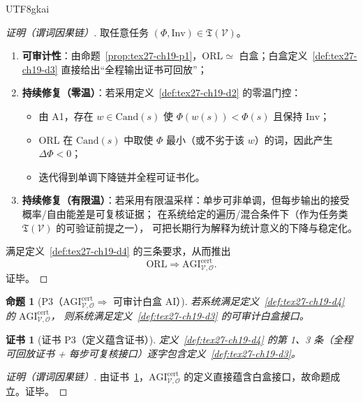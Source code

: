 \documentclass[12pt]{article}
\newtheorem{proposition}{命题}[section]
\newtheorem{Certificate}{证书}[section]
\begin{document}
\begin{CJK*}{UTF8}{gkai}
\begin{proof}[证明（谓词因果链）]
取任意任务 $(\Phi,\mathrm{Inv})\in\mathfrak{T}(\mathcal{V})$。
\begin{enumerate}
  \item \textbf{可审计性}：由命题~\ref{prop:tex27-ch19-p1}，$\mathrm{ORL}\simeq$ 白盒；白盒定义~\ref{def:tex27-ch19-d3} 直接给出“全程输出证书可回放”；
  \item \textbf{持续修复（零温）}：若采用定义~\ref{def:tex27-ch19-d2} 的零温门控：
  \begin{itemize}
    \item 由 A1，存在 $w\in\mathrm{Cand}(s)$ 使 $\Phi(w(s))<\Phi(s)$ 且保持 $\mathrm{Inv}$；
    \item ORL 在 $\mathrm{Cand}(s)$ 中取使 $\Phi$ 最小（或不劣于该 $w$）的词，因此产生 $\Delta\Phi<0$；
    \item 迭代得到单调下降链并全程可证书化。
  \end{itemize}
  \item \textbf{持续修复（有限温）}：若采用有限温采样：单步可非单调，但每步输出的接受概率/自由能差是可复核证据；
  在系统给定的遍历/混合条件下（作为任务类 $\mathfrak{T}(\mathcal{V})$ 的可验证前提之一），
  可把长期行为解释为统计意义的下降与稳定化。
\end{enumerate}
满足定义~\ref{def:tex27-ch19-d4} 的三条要求，从而推出
\[
  \mathrm{ORL}\Rightarrow \mathrm{AGI}^{\mathrm{cert}}_{\mathcal{V},\mathcal{O}}.
\]
证毕。
\end{proof}

\begin{proposition}[P3（$\mathrm{AGI}^{\mathrm{cert}}_{\mathcal{V},\mathcal{O}}\Rightarrow$ 可审计白盒 AI）]
\label{prop:tex27-ch19-p3}
若系统满足定义~\ref{def:tex27-ch19-d4} 的 $\mathrm{AGI}^{\mathrm{cert}}_{\mathcal{V},\mathcal{O}}$，
则系统满足定义~\ref{def:tex27-ch19-d3} 的可审计白盒接口。
\end{proposition}

\begin{Certificate}[证书 P3（定义蕴含证书）]
\label{cert:tex27-ch19-p3}
定义~\ref{def:tex27-ch19-d4} 的第 1、3 条（全程可回放证书 + 每步可复核接口）逐字包含定义~\ref{def:tex27-ch19-d3}。
\end{Certificate}

\begin{proof}[证明（谓词因果链）]
由证书~\ref{cert:tex27-ch19-p3}，$\mathrm{AGI}^{\mathrm{cert}}_{\mathcal{V},\mathcal{O}}$ 的定义直接蕴含白盒接口，故命题成立。证毕。
\end{proof}


\end{CJK*}
\end{document}
